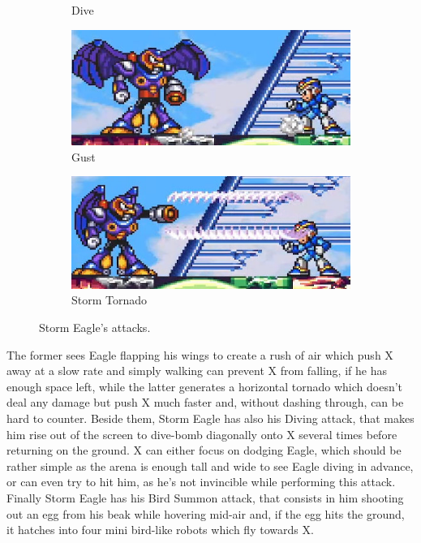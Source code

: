 \begin{figure}[htp]
\begin{subfigure}{0.35\linewidth}
		\caption{Dive}
	\end{subfigure}
	\begin{subfigure}{0.4\linewidth}
		\centering
		\includegraphics[width=\linewidth]{figures/X1/Storm_eagle/Eagle_push.jpg}
		\caption{Gust}
	\end{subfigure}
	\begin{subfigure}{0.4\linewidth}
		\centering
		\includegraphics[width=\linewidth]{figures/X1/Storm_eagle/Eagle_tornado.jpg}
		\caption{Storm Tornado}
	\end{subfigure}
	\caption{Storm Eagle's attacks.}
\end{figure}


The former sees Eagle flapping his wings to create a rush of air which push X away at a slow rate and simply walking can prevent X from falling, if he has enough space left, while the latter generates a horizontal tornado which doesn't deal any damage but push X much faster and, without dashing through, can be hard to counter. Beside them, Storm Eagle has also his Diving attack, that makes him rise out of the screen to dive-bomb diagonally onto X several times before returning on the ground. X can either focus on dodging Eagle, which should be rather simple as the arena is enough tall and wide to see Eagle diving in advance, or can even try to hit him, as he's not invincible while performing this attack. Finally Storm Eagle has his Bird Summon attack, that consists in him shooting out an egg from his beak while hovering mid-air and, if the egg hits the ground, it hatches into four mini bird-like robots which fly towards X. 

